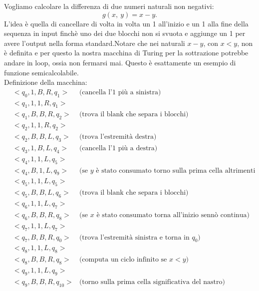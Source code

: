 \begin{esempio}[Sottrazione]
Vogliamo calcolare la differenza di due numeri naturali non
negativi: $$g(x,\ y)=x-y.$$ L'idea \`e quella di cancellare di volta
in volta un 1 all'inizio e un 1 alla fine della sequenza in input
finch\`e uno dei due blocchi non si svuota e aggiunge un 1 per avere
l'output nella forma standard.\newline Notare che nei naturali $x-y$,
con $x<y$, non \`e definita e per questo la nostra macchina di Turing
per la sottrazione potrebbe andare in loop, ossia non fermarsi
mai. Questo \`e esattamente un esempio di funzione semicalcolabile.\\

Definizione della macchina:
\begin{eqnarray*}
&<q_{0},1,B,R,q_{1}>&\mbox{(cancella l'1 pi\`u a sinistra)}\\
&<q_{1},1,1,R,q_{1}>&\\
&<q_{1},B,B,R,q_{2}>&\mbox{(trova il blank che separa i blocchi)}\\
&<q_{2},1,1,R,q_{2}>&\\
&<q_{2},B,B,L,q_{3}>&\mbox{(trova l'estremit\`a destra)}\\
&<q_{3},1,B,L,q_{4}>&\mbox{(cancella l'1 pi\`u a destra)}\\
&<q_{4},1,1,L,q_{5}>&\\
&<q_{4},B,1,L,q_{9}>&\mbox{(se $y$ \`e stato consumato torno sulla prima cella altrimenti continua)}\\
&<q_{5},1,1,L,q_{5}>&\\
&<q_{5},B,B,L,q_{6}>&\mbox{(trova il blank che separa i blocchi)}\\
&<q_{6},1,1,L,q_{7}>&\\
&<q_{6},B,B,R,q_{8}>&\mbox{(se $x$ \`e stato consumato torna all'inizio senn\`o continua)}\\
&<q_{7},1,1,L,q_{7}>&\\
&<q_{7},B,B,R,q_{0}>&\mbox{(trova l'estremit\`a sinistra e torna in $q_{0}$)}\\
&<q_{8},1,1,L,q_{8}>&\\
&<q_{8},B,B,R,q_{8}>&\mbox{(computa un ciclo infinito se $x< y$)}\\
&<q_{9},1,1,L,q_{9}>&\\
&<q_{9},B,B,R,q_{10}>&\mbox{(torno sulla prima cella significativa del nastro)}\\
\end{eqnarray*}


\end{esempio}
